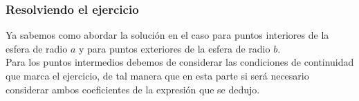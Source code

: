 \documentclass[12pt]{beamer}
\begin{document}
\begin{frame}
\frametitle{Resolviendo el ejercicio}
Ya sabemos como abordar la solución en el caso para puntos interiores de la esfera de radio $a$ y para puntos exteriores de la esfera de radio $b$.
\\
\bigskip
\pause
Para los puntos intermedios debemos de considerar las condiciones de continuidad que marca el ejercicio, de tal manera que en esta parte si será necesario considerar ambos coeficientes de la expresión que se dedujo.
\end{frame}
\end{document}
